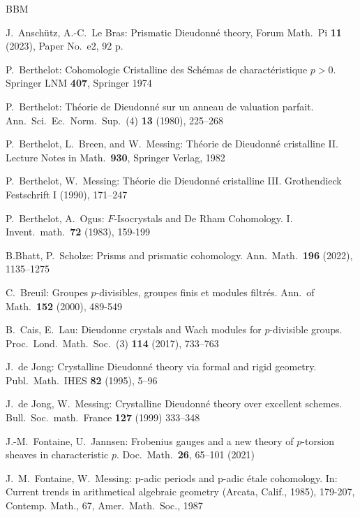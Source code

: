 \documentclass[a4paper,11pt]{article}
\theoremstyle{plain}
\theoremstyle{definition}
\theoremstyle{remark}
\theoremstyle{definition}
\numberwithin{Lemma}{section}
\numberwithin{Subpoint}{Lemma}
\numberwithin{equation}{section}
\begin{document}
\begin{thebibliography}{BBM}

J.~Ansch\"utz, A.-C.~Le Bras:
Prismatic Dieudonn\'e theory, 
Forum Math.\ Pi {\bf 11}  (2023), Paper No.\ e2, 92 p.

P.~Berthelot:
Cohomologie Cristalline des Sch\'emas de charact\'eris\-tique $p>0$.
Springer LNM {\bf 407}, Springer 1974

P.~Berthelot:
Th\'eorie de Dieudonn\'e sur un anneau de valuation parfait.
Ann.\ Sci.\ Ec.\ Norm.\ Sup.\ (4) {\bf 13} (1980), 225--268

P.~Berthelot, L.~Breen, and W.~Messing: 
Th\'{e}orie de Dieudonn\'{e} cristalline II.
Lecture Notes in Math.\ {\bf 930}, Springer Verlag, 1982 

P.~Berthelot, W.~Messing:
Th\'eorie die Dieudonn\'e cristalline III.
Grothendieck Festschrift I (1990), 171--247

P.~Berthelot, A.~Ogus:
$F$-Isocrystals and De Rham Cohomology. I.
Invent.\ math.\ {\bf 72} (1983), 159-199 

B.Bhatt, P.~Scholze:
Prisms and prismatic cohomology.
Ann.\ Math.\ {\bf 196} (2022), 1135--1275

C.~Breuil:
Groupes {$p$}-divisibles, groupes finis et modules filtr\'es.
Ann.\ of Math.\ {\bf 152} (2000), 489-549

B.~Cais, E.~Lau:
Dieudonne crystals and Wach modules for $p$-divisible groups.
Proc.\ Lond.\ Math.\ Soc.\ (3) {\bf 114} (2017), 733--763

J.~de Jong:
Crystalline Dieudonn\'e theory via formal and rigid geometry.
Publ.~Math.~IHES {\bf 82} (1995), 5--96

J.~de Jong, W.~Messing:
Crystalline Dieudonn\'e theory over excellent schemes.
Bull.\ Soc.\ math.\ France {\bf 127} (1999) 333--348

J.-M.~Fontaine, U.~Jannsen:
Frobenius gauges and a new theory of $p$-torsion sheaves in characteristic $p$.
Doc.\ Math.\ {\bf 26}, 65--101 (2021)

J.~M.~Fontaine, W.~Messing:
p-adic periods and p-adic \'etale cohomology. 
In: Current trends in arithmetical algebraic geometry 
(Arcata, Calif., 1985), 179-207, 
Contemp. Math., 67, Amer.\ Math.\ Soc., 1987


\end{thebibliography}
\end{document}
